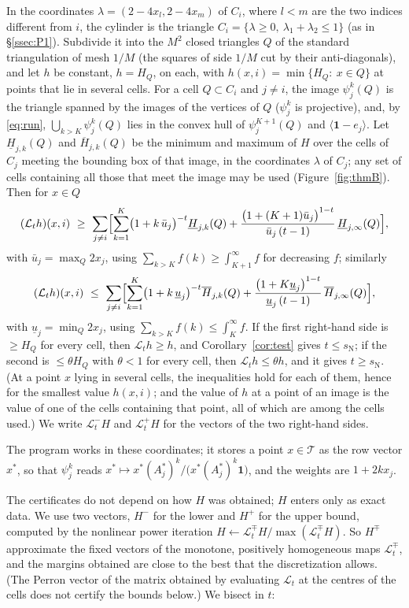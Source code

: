\documentclass[11pt]{amsart}
\theoremstyle{definition}
\theoremstyle{remark}
\newcommand{\one}{\mathbf 1}
\newcommand{\cT}{\mathcal T}
\newcommand{\cL}{\mathcal L}
\newcommand{\sN}{s_{\mathrm N}}
\newcommand{\pr}[1]{\langle #1\rangle}
\begin{document}
In the coordinates $\lambda=(2-4x_l,2-4x_m)$ of $C_i$, where $l<m$ are the two indices different from $i$, the cylinder is the triangle $C_i=\{\lambda\ge0,\ \lambda_1+\lambda_2\le1\}$ (as in \S\ref{ssec:P1}). Subdivide it into the $M^2$ closed triangles $Q$ of the standard triangulation of mesh $1/M$ (the squares of side $1/M$ cut by their anti-diagonals), and let $h$ be
constant, $h=H_Q$, on each, with $h(x,i)=\min\{H_Q:\ x\in Q\}$ at points that lie in several cells. For a cell $Q\subset C_i$ and $j\neq i$, the image
$\psi_j^k(Q)$ is the triangle spanned by the images of the vertices of $Q$
($\psi_j^k$ is projective), and, by \eqref{eq:run}, $\bigcup_{k>K}\psi_j^k(Q)$ lies in the convex hull of
$\psi_j^{K+1}(Q)$ and $\pr{\one-e_j}$. Let $\underline H_{j,k}(Q)$ and $\overline H_{j,k}(Q)$ be the
minimum and maximum of $H$ over the cells of $C_j$ meeting the bounding box of that
image, in the coordinates $\lambda$ of $C_j$; any set of cells containing all those that
meet the image may be used (Figure~\ref{fig:thmB}). Then for $x\in Q$
\[
  (\cL_th)(x,i)\ \ge\ \sum_{j\ne i}\Bigl[\sum_{k=1}^K\bigl(1+k\,\bar u_j\bigr)^{-t}
  \underline H_{j,k}(Q)+\frac{\bigl(1+(K+1)\bar u_j\bigr)^{1-t}}{\bar u_j\,(t-1)}\,
  \underline H_{j,\infty}(Q)\Bigr],
\]
with $\bar u_j=\max_Q2x_j$, using $\sum_{k>K}f(k)\ge\int_{K+1}^\infty f$ for
decreasing $f$; similarly
\[
  (\cL_th)(x,i)\ \le\ \sum_{j\ne i}\Bigl[\sum_{k=1}^K\bigl(1+k\,\underline u_j\bigr)^{-t}
  \overline H_{j,k}(Q)+\frac{\bigl(1+K\underline u_j\bigr)^{1-t}}{\underline u_j\,(t-1)}\,
  \overline H_{j,\infty}(Q)\Bigr],
\]
with $\underline u_j=\min_Q2x_j$, using $\sum_{k>K}f(k)\le\int_K^\infty f$.
If the first right-hand side is $\ge H_Q$ for every cell, then $\cL_th\ge h$, and Corollary~\ref{cor:test} gives $t\le\sN$; if the second is $\le\theta H_Q$ with $\theta<1$ for every cell, then $\cL_th\le\theta h$, and it gives $t\ge\sN$. (At a point $x$ lying in several cells, the inequalities hold for each of them, hence for the smallest value $h(x,i)$; and the value of $h$ at a point of an image is the value of one of the cells containing that point, all of which are among the cells used.) We write $\cL_t^-H$ and $\cL_t^+H$ for the vectors of the two right-hand sides.

The program works in these coordinates; it stores a point $x\in\cT$ as the row vector $x^*$, so that $\psi_j^k$ reads $x^*\mapsto x^*(A_j^*)^k/\bigl(x^*(A_j^*)^k\one\bigr)$, and the weights are $1+2kx_j$.

The certificates do not depend on how $H$ was obtained; $H$ enters only as exact data. We use two vectors, $H^-$ for the lower and $H^+$ for the upper bound, computed by the nonlinear power iteration $H\leftarrow\cL_t^\mp H/\max(\cL_t^\mp H)$. So $H^\mp$ approximate the fixed vectors of the monotone, positively homogeneous maps $\cL^\mp_t$, and the margins obtained are close to the best that the discretization allows. (The Perron vector of the matrix obtained by evaluating $\cL_t$ at the centres of the cells does not certify the bounds below.) We bisect in $t$:
\end{document}
